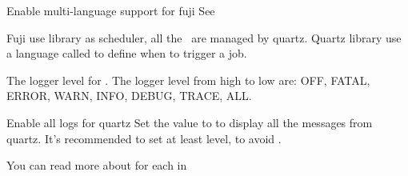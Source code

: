 \begin{Configuration}
{\begin{NestedList}
{\begin{NestedList}
{                        \begin{tips}{Enable multi-language support for fuji}
                            See~
                        \end{tips}
                    }

                \end{NestedList}

            }
        \end{NestedList}

        \begin{NestedList}
            \item[quartz]{
                Fuji use  library as scheduler, all the~ are managed by quartz.
                Quartz library use a language called  to define when to trigger a job.

                \begin{NestedList}
                    \item[logger\_level]
                    The logger level for .
                    The logger level from high to low are: OFF, FATAL, ERROR, WARN, INFO, DEBUG, TRACE, ALL.

                    \begin{example}{Enable all logs for quartz}
                        Set the value to  to display all the messages from quartz.
                        It's recommended to set at least  level, to avoid .
                    \end{example}

                \end{NestedList}

            }
        \end{NestedList}


    }

\end{Configuration}

\clearpage
{}
You can read more about  for each  in 